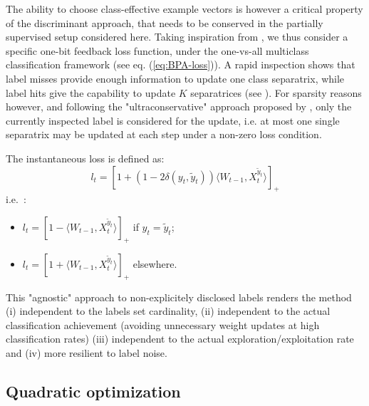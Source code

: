 \documentclass[preprint,12pt,authoryear]{elsarticle}
\begin{document}
The ability to choose class-effective example vectors is however  a critical property of the discriminant approach, that needs to be conserved in the partially supervised setup considered here. 
Taking inspiration from \cite{crammer2006online}, we thus consider a specific one-bit feedback loss function, under the one-vs-all multiclass classification framework (see eq. (\ref{eq:BPA-loss})). A rapid inspection shows that label misses provide enough information to update one class separatrix, while label hits give the capability to update $K$ separatrices (see \cite{chen2009beyond}). For sparsity reasons however, and following the "ultraconservative" approach proposed by \cite{crammer2003ultraconservative}, only the currently inspected label is considered for the update, i.e. at most one single separatrix may be updated at each step under a non-zero loss condition.

The instantaneous loss is defined as:
\begin{equation}\label{eq:loss}
l_t = [1 + (1 - 2 \delta(y_t,\tilde{y}_t)) \langle W_{t-1}, X_t^{\tilde{y}_t}\rangle]_+
\end{equation}
i.e.~:
\begin{itemize}
	\item[] $l_t = [1 - \langle W_{t-1}, X_t^{\tilde{y}_t}\rangle]_+$ if $y_t=\tilde{y}_t$;
	\item[] $l_t = [1 + \langle W_{t-1}, X_t^{\tilde{y}_t}\rangle]_+$ elsewhere.
\end{itemize}
This "agnostic" approach to non-explicitely disclosed labels %
renders the method (i) independent to the labels set cardinality, (ii) independent to the actual classification achievement (avoiding unnecessary weight updates at high classification rates) (iii) independent to the actual exploration/exploitation rate and (iv) more resilient to label noise. 

\subsection{Quadratic optimization}
 
\end{document}
